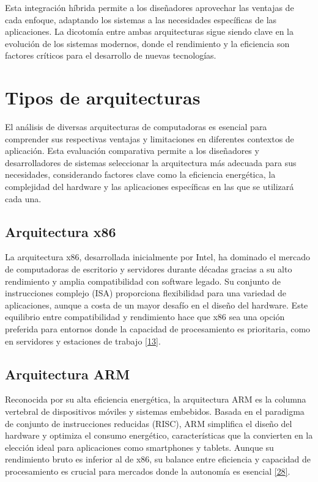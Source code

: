 \documentclass[12pt,oneside]{templates/unerthesis}
\begin{document}
Esta integración híbrida permite a los diseñadores aprovechar las ventajas de cada enfoque, adaptando los sistemas a las necesidades específicas de las aplicaciones. La dicotomía entre ambas arquitecturas sigue siendo clave en la evolución de los sistemas modernos, donde el rendimiento y la eficiencia son factores críticos para el desarrollo de nuevas tecnologías.

\hypertarget{tipos-de-arquitecturas}{%
\section{Tipos de arquitecturas}\label{tipos-de-arquitecturas}}

El análisis de diversas arquitecturas de computadoras es esencial para comprender sus respectivas ventajas y limitaciones en diferentes contextos de aplicación. Esta evaluación comparativa permite a los diseñadores y desarrolladores de sistemas seleccionar la arquitectura más adecuada para sus necesidades, considerando factores clave como la eficiencia energética, la complejidad del hardware y las aplicaciones específicas en las que se utilizará cada una.

\hypertarget{arquitectura-x86}{%
\subsection{Arquitectura x86}\label{arquitectura-x86}}

La arquitectura x86, desarrollada inicialmente por Intel, ha dominado el mercado de computadoras de escritorio y servidores durante décadas gracias a su alto rendimiento y amplia compatibilidad con software legado. Su conjunto de instrucciones complejo (ISA) proporciona flexibilidad para una variedad de aplicaciones, aunque a costa de un mayor desafío en el diseño del hardware. Este equilibrio entre compatibilidad y rendimiento hace que x86 sea una opción preferida para entornos donde la capacidad de procesamiento es prioritaria, como en servidores y estaciones de trabajo \protect\hyperlink{ref-hennessy_computer_2012}{{[}13{]}}.

\hypertarget{arquitectura-arm}{%
\subsection{Arquitectura ARM}\label{arquitectura-arm}}

Reconocida por su alta eficiencia energética, la arquitectura ARM es la columna vertebral de dispositivos móviles y sistemas embebidos. Basada en el paradigma de conjunto de instrucciones reducidas (RISC), ARM simplifica el diseño del hardware y optimiza el consumo energético, características que la convierten en la elección ideal para aplicaciones como smartphones y tablets. Aunque su rendimiento bruto es inferior al de x86, su balance entre eficiencia y capacidad de procesamiento es crucial para mercados donde la autonomía es esencial \protect\hyperlink{ref-patterson_computer_2014}{{[}28{]}}.
\end{document}
